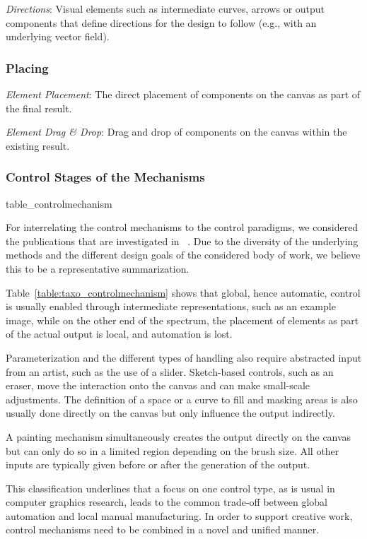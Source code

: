 \textit{Directions}: Visual elements such as intermediate curves, arrows or output components that define directions for the design to follow (e.g., with an underlying vector field).


\subsubsection{Placing}


\textit{Element Placement}: The direct placement of components on the canvas as part of the final result.

\textit{Element Drag \& Drop}: Drag and drop of components on the canvas within the existing result.


\subsubsection{Control Stages of the Mechanisms}
\label{subsec:taxo_control_mechanism}

{table_controlmechanism}

For interrelating the control mechanisms to the control paradigms, we considered the publications that are investigated in ~. Due to the diversity of the underlying methods and the different design goals of the considered body of work, we believe this to be a representative summarization.

Table~\ref{table:taxo_controlmechanism} shows that global, hence automatic, control is usually enabled through intermediate representations, such as an example image, while on the other end of the spectrum, the placement of elements as part of the actual output is local, and automation is lost.

Parameterization and the different types of handling also require abstracted input from an artist, such as the use of a slider. Sketch-based controls, such as an eraser, move the interaction onto the canvas and can make small-scale adjustments. The definition of a space or a curve to fill and masking areas is also usually done directly on the canvas but only influence the output indirectly.

A painting mechanism simultaneously creates the output directly on the canvas but can only do so in a limited region depending on the brush size. All other inputs are typically given before or after the generation of the output.

This classification underlines that a focus on one control type, as is usual in computer graphics research, leads to the common trade-off between global automation and local manual manufacturing. In order to support creative work, control mechanisms need to be combined in a novel and unified manner.


